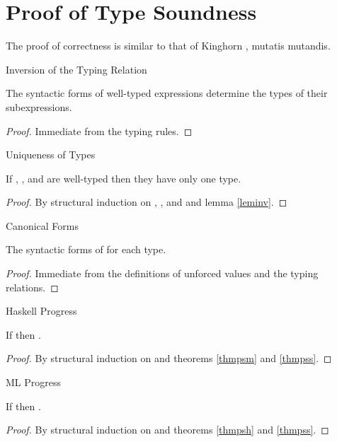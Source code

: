 \section{Proof of Type Soundness}

The proof of correctness is similar to that of Kinghorn \cite{kinghorn07}, mutatis mutandis.

\begin{lemma}{Inversion of the Typing Relation}

\label{leminv}
The syntactic forms of well-typed expressions determine the types of their subexpressions.
\begin{proof}
Immediate from the typing rules.
\end{proof}
\end{lemma}

\begin{lemma}{Uniqueness of Types}

\label{lemuni}
If \varexph, \varexpm, and \varexps are well-typed then they have only one type.
\begin{proof}
By structural induction on \varexph, \varexpm, and \varexps and lemma \ref{leminv}.
\end{proof}
\end{lemma}

\begin{lemma}{Canonical Forms}

\label{lemcan}
The syntactic forms of \prouvs for each type.
\begin{proof}
Immediate from the definitions of unforced values and the typing relations.
\end{proof}
\end{lemma}

\begin{theorem}{Haskell Progress}

\label{thmpsh}
If \judeh{}{\first{\varexph}}{\vartyh} then \pshyp{\first{\varexph}}{\second{\varexph}}.
\begin{proof}
By structural induction on \first{\varexph} and theorems \ref{thmpsm} and \ref{thmpss}.
\end{proof}
\end{theorem}

\begin{theorem}{ML Progress}

\label{thmpsm}
If \judem{}{\first{\varexpm}}{\vartym} then \pshyp{\first{\varexpm}}{\second{\varexpm}}.
\begin{proof}
By structural induction on \first{\varexpm} and theorems \ref{thmpsh} and \ref{thmpss}.
\end{proof}
\end{theorem}

